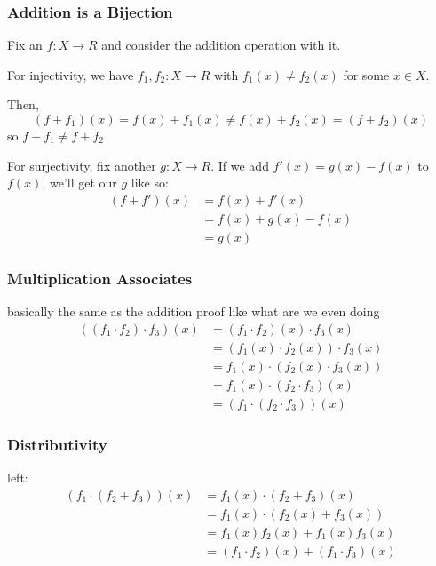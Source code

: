 \documentclass[12pt]{article}
\begin{document}
\subsubsection{Addition is a Bijection}

Fix an $f: X \to R$ and consider the addition operation with it.

For injectivity, we have $f_1, f_2: X \to R$ with $f_1(x) \ne f_2(x)$ for some $x \in X$.

Then,
\[(f+f_1)(x) = f(x)+f_1(x) \ne f(x)+f_2(x)=(f+f_2)(x)\]
so $f+f_1 \ne f+f_2$

For surjectivity, fix another $g: X \to R$.
If we add $f'(x)=g(x)-f(x)$ to $f(x)$, we'll get our $g$ like so:
\begin{align*}
  (f+f')(x)
   & = f(x)+f'(x)     \\
   & = f(x)+g(x)-f(x) \\
   & = g(x)
\end{align*}

\subsubsection{Multiplication Associates}

basically the same as the addition proof like what are we even doing
\begin{align*}
  ((f_1 \cdot f_2) \cdot f_3)(x)
   & = (f_1 \cdot f_2)(x) \cdot f_3(x)    \\
   & = (f_1(x) \cdot f_2(x)) \cdot f_3(x) \\
   & = f_1(x) \cdot (f_2(x) \cdot f_3(x)) \\
   & = f_1(x) \cdot (f_2 \cdot f_3)(x)    \\
   & = (f_1 \cdot (f_2 \cdot f_3))(x)
\end{align*}

\subsubsection{Distributivity}

left:
\begin{align*}
  (f_1 \cdot (f_2 + f_3))(x)
   & = f_1(x) \cdot (f_2+f_3)(x)               \\
   & = f_1(x) \cdot (f_2(x)+f_3(x))            \\
   & = f_1(x)f_2(x) + f_1(x)f_3(x)             \\
   & = (f_1 \cdot f_2)(x) + (f_1 \cdot f_3)(x)
\end{align*}
\end{document}
